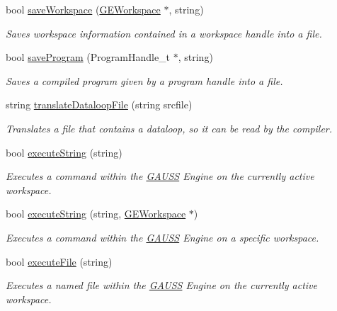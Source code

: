\begin{DoxyCompactItemize}
bool \hyperlink{class_g_a_u_s_s_acc7a8039355ae28686d9393144b2af75}{save\-Workspace} (\hyperlink{class_g_e_workspace}{G\-E\-Workspace} $\ast$, string)
\begin{DoxyCompactList}\small\item\em Saves workspace information contained in a workspace handle into a file. \end{DoxyCompactList}\item 
bool \hyperlink{class_g_a_u_s_s_af6c2bb49b3906debb760e103cc1436f9}{save\-Program} (Program\-Handle\-\_\-t $\ast$, string)
\begin{DoxyCompactList}\small\item\em Saves a compiled program given by a program handle into a file. \end{DoxyCompactList}\item 
string \hyperlink{class_g_a_u_s_s_a7403bd9564a21a81f790e88da97ff780}{translate\-Dataloop\-File} (string srcfile)
\begin{DoxyCompactList}\small\item\em Translates a file that contains a dataloop, so it can be read by the compiler. \end{DoxyCompactList}\item 
bool \hyperlink{class_g_a_u_s_s_a5e936488bfa9422a6267afbe7ab8ffe2}{execute\-String} (string)
\begin{DoxyCompactList}\small\item\em Executes a command within the \hyperlink{class_g_a_u_s_s}{G\-A\-U\-S\-S} Engine on the currently active workspace. \end{DoxyCompactList}\item 
bool \hyperlink{class_g_a_u_s_s_a32f1488454a0ee5522626fc8d322fea1}{execute\-String} (string, \hyperlink{class_g_e_workspace}{G\-E\-Workspace} $\ast$)
\begin{DoxyCompactList}\small\item\em Executes a command within the \hyperlink{class_g_a_u_s_s}{G\-A\-U\-S\-S} Engine on a specific workspace. \end{DoxyCompactList}\item 
bool \hyperlink{class_g_a_u_s_s_a1e15d3c30be612b67ecb67ed7a39b185}{execute\-File} (string)
\begin{DoxyCompactList}\small\item\em Executes a named file within the \hyperlink{class_g_a_u_s_s}{G\-A\-U\-S\-S} Engine on the currently active workspace. \end{DoxyCompactList}\item 

\end{DoxyCompactItemize}
